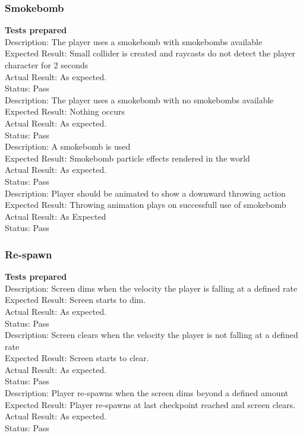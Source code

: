 \documentclass[11pt,a4paper]{article}
\begin{document}
\subsubsection{Smokebomb}
\textbf{Tests prepared}\\
Description: The player uses a smokebomb with smokebombs available\\
Expected Result: Small collider is created and raycasts do not detect the player character for 2 seconds\\
Actual Result: As expected.\\
Status: Pass
\smallskip\\
Description: The player uses a smokebomb with no smokebombs available \\
Expected Result: Nothing occurs\\
Actual Result: As expected.\\
Status: Pass
\smallskip\\
Description: A smokebomb is used \\
Expected Result: Smokebomb particle effects rendered in the world\\
Actual Result: As expected.\\
Status: Pass
\smallskip\\
Description: Player should be animated to show a downward throwing action\\
Expected Result: Throwing animation plays on successfull use of smokebomb\\
Actual Result: As Expected\\
Status: Pass
\subsubsection{Re-spawn}
\textbf{Tests prepared}\\
Description: Screen dims when the velocity the player is falling at a defined rate\\
Expected Result: Screen starts to dim.\\
Actual Result: As expected.\\
Status: Pass
\smallskip\\
Description: Screen clears when the velocity the player is not falling at a defined rate\\
Expected Result: Screen starts to clear.\\
Actual Result: As expected.\\
Status: Pass
\smallskip\\
Description: Player re-spawns when the screen dims beyond a defined amount\\
Expected Result: Player re-spawns at last checkpoint reached and screen clears.\\
Actual Result: As expected.\\
Status: Pass
\end{document}
